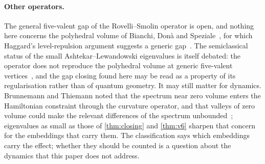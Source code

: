 \paragraph{Other operators.}
The general five-valent gap of the Rovelli--Smolin operator is open, and nothing here
concerns the polyhedral volume of Bianchi, Don\`a and Speziale~\cite{BDS2011}, for which
Haggard's level-repulsion argument suggests a generic gap~\cite{Haggard2013}. The
semiclassical status of the small Ashtekar--Lewandowski eigenvalues is itself debated: the
operator does not reproduce the polyhedral volume at generic five-valent
vertices~\cite{BDS2011,FT2008}, and the gap closing found here may be read as a property
of its regularisation rather than of quantum geometry. It may still matter for
dynamics. Brunnemann and Thiemann noted that the spectrum near zero volume enters the
Hamiltonian constraint through the curvature operator, and that valleys of zero
volume could make the relevant differences of the spectrum unbounded~\cite[p.~46]{BT2006};
eigenvalues as small as those of \cref{thm:closing} and \cref{thm:v6} sharpen that concern
for the embeddings that carry them. The classification says which embeddings carry the
effect; whether they should be counted is a question about the dynamics that this paper
does not address.
